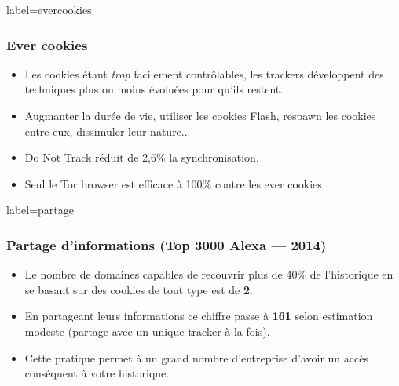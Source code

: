\documentclass{beamer}
\begin{document}
        \begin{frame}{label=evercookies}
          \frametitle{Ever cookies}
            \begin{center}
                \begin{itemize}
                    \item Les cookies étant \textit{trop} facilement contrôlables, les trackers développent des techniques plus ou moins évoluées pour qu'ils restent.
                    \item Augmanter la durée de vie, utiliser les cookies Flash, respawn les cookies entre eux, dissimuler leur nature...
                    \item Do Not Track réduit de 2,6\% la synchronisation.
                    \item Seul le Tor browser est efficace à 100\% contre les ever cookies
                \end{itemize}
            \end{center}
        \end{frame}
        \begin{frame}{label=partage}
          \frametitle{Partage d'informations (Top 3000 Alexa --- 2014)}
            \begin{center}
                \begin{itemize}
                    \item Le nombre de domaines capables de recouvrir plus de 40\% de l'historique en se basant sur des cookies de tout type est de \textbf{2}.
                    \item En partageant leurs informations ce chiffre passe à \textbf{161} selon estimation modeste (partage avec un unique tracker à la fois).
                    \item Cette pratique permet à un grand nombre d'entreprise d'avoir un accès conséquent à votre historique.
                \end{itemize}
            \end{center}
        \end{frame}
\end{document}
